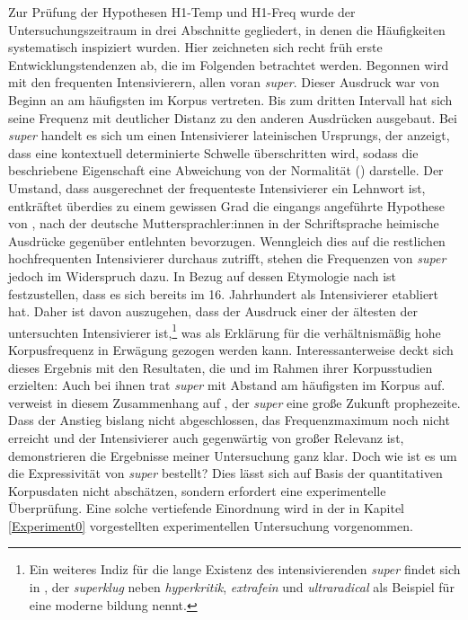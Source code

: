 Zur Prüfung der Hypothesen H1-Temp und H1-Freq wurde der Untersuchungszeitraum in drei Abschnitte gegliedert, in denen die Häufigkeiten systematisch inspiziert wurden. Hier zeichneten sich recht früh erste Entwicklungstendenzen ab, die im Folgenden betrachtet werden. Begonnen wird mit den frequenten Intensivierern, allen voran \textit{super}. Dieser Ausdruck war von Beginn an am häufigsten im Korpus vertreten. Bis zum dritten Intervall hat sich seine Frequenz mit deutlicher Distanz zu den anderen Ausdrücken ausgebaut. Bei \textit{super} handelt es sich um einen Intensivierer lateinischen Ursprungs, der anzeigt, dass eine kontextuell determinierte Schwelle überschritten wird, sodass die beschriebene Eigenschaft eine \glqq{}Abweichung von der Normalität\grqq{} (\citealt[80]{Ruf.1996}) darstelle. Der Umstand, dass ausgerechnet der frequenteste Intensivierer ein Lehnwort ist, entkräftet überdies zu einem gewissen Grad die eingangs angeführte Hypothese von \citet[323]{Calpestrati.2017}, nach der deutsche Muttersprachler:innen in der Schriftsprache heimische Ausdrücke gegenüber entlehnten bevorzugen. Wenngleich dies auf die restlichen hochfrequenten Intensivierer durchaus zutrifft, stehen die Frequenzen von \textit{super} jedoch im Widerspruch dazu. In Bezug auf dessen Etymologie nach \citet[1398]{Pfeifer.1995} ist festzustellen, dass es sich bereits im 16. Jahrhundert als Intensivierer etabliert hat. Daher ist davon auszugehen, dass der Ausdruck einer der ältesten der untersuchten Intensivierer ist,\footnote{Ein weiteres Indiz für die lange Existenz des intensivierenden \textit{super} findet sich in \citet[109]{Tobler.1868}, der \textit{superklug} neben \textit{hyperkritik}, \textit{extrafein} und \textit{ultraradical} als Beispiel für eine \glqq{}moderne bildung\grqq{} nennt.} was als Erklärung für die verhältnismäßig hohe Korpusfrequenz in Erwägung gezogen werden kann. Interessanterweise deckt sich dieses Ergebnis mit den Resultaten, die \citet[345]{Ruf.1996} und \citet[104]{Androutsopoulos.1998} im Rahmen ihrer Korpusstudien erzielten: Auch bei ihnen trat \textit{super} mit Abstand am häufigsten im Korpus auf. \citet[345]{Ruf.1996} verweist in diesem Zusammenhang auf \citet[]{Wunderlich.1983}, der \textit{super} eine \glqq{}große Zukunft\grqq{} prophezeite. Dass der Anstieg bislang nicht abgeschlossen, das Frequenzmaximum noch nicht erreicht und der Intensivierer auch gegenwärtig von großer Relevanz ist, demonstrieren die Ergebnisse meiner Untersuchung ganz klar. Doch wie ist es um die Expressivität von \textit{super} bestellt? Dies lässt sich auf Basis der quantitativen Korpusdaten nicht abschätzen, sondern erfordert eine experimentelle Überprüfung. Eine solche vertiefende Einordnung wird in der in Kapitel \ref{Experiment0} vorgestellten experimentellen Untersuchung vorgenommen.

